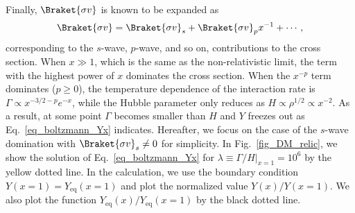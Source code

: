 \documentclass[12pt,twoside,book]{article}
\begin{document}
Finally, $\Braket{\sigma v}$ is known to be expanded as~\cite{Gondolo:1990dk}
\begin{align}
  \Braket{\sigma v} = \Braket{\sigma v}_s +
  \Braket{\sigma v}_p x^{-1} + \cdots,
\end{align}
corresponding to the $s$-wave, $p$-wave, and so on, contributions to the cross section.
When $x \gg 1$, which is the same as the non-relativistic limit, the term with the highest power of $x$ dominates the cross section.  When the $x^{-p}$ term dominates ($p \geq 0$), the temperature dependence of the interaction rate is $\Gamma \propto x^{-3/2-p} e^{-x}$, while the Hubble parameter only reduces as $H \propto \rho^{1/2} \propto x^{-2}$.
As a result, at some point $\Gamma$ becomes smaller than $H$ and $Y$ freezes out as Eq.~\eqref{eq_boltzmann_Yx} indicates.
Hereafter, we focus on the case of the $s$-wave domination with $\Braket{\sigma v}_s \neq 0$ for simplicity.
In Fig.~\ref{fig_DM_relic}, we show the solution of Eq.~\eqref{eq_boltzmann_Yx} for $\lambda \equiv \left. \Gamma / H \right|_{x=1} = 10^6$ by the yellow dotted line.
In the calculation, we use the boundary condition $Y(x=1) = Y_{\mathrm{eq}} (x=1)$ and plot the normalized value $Y(x) / Y(x=1)$.  We also plot the function $Y_{\mathrm{eq}} (x) / Y_{\mathrm{eq}} (x=1)$ by the black dotted line.
\end{document}
